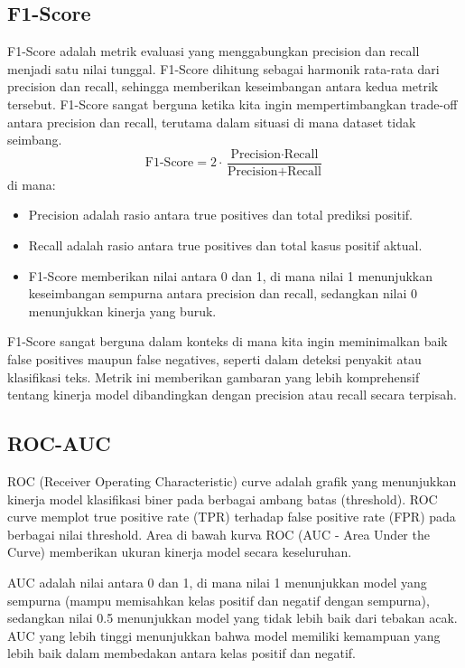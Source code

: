 \subsection{F1-Score}
F1-Score adalah metrik evaluasi yang menggabungkan precision dan recall menjadi satu nilai tunggal. F1-Score dihitung sebagai harmonik rata-rata dari precision dan recall, sehingga memberikan keseimbangan antara kedua metrik tersebut. F1-Score sangat berguna ketika kita ingin mempertimbangkan trade-off antara precision dan recall, terutama dalam situasi di mana dataset tidak seimbang.
\begin{equation}
    \text{F1-Score} = 2 \cdot \frac{\text{Precision} \cdot \text{Recall}}{\text{Precision} + \text{Recall}}
\end{equation}
di mana:
\begin{itemize}
    \item Precision adalah rasio antara true positives dan total prediksi positif.
    \item Recall adalah rasio antara true positives dan total kasus positif aktual.
    \item F1-Score memberikan nilai antara 0 dan 1, di mana nilai 1 menunjukkan keseimbangan sempurna antara precision dan recall, sedangkan nilai 0 menunjukkan kinerja yang buruk.
\end{itemize}
F1-Score sangat berguna dalam konteks di mana kita ingin meminimalkan baik false positives maupun false negatives, seperti dalam deteksi penyakit atau klasifikasi teks. Metrik ini memberikan gambaran yang lebih komprehensif tentang kinerja model dibandingkan dengan precision atau recall secara terpisah.

\subsection{ROC-AUC}
ROC (Receiver Operating Characteristic) curve adalah grafik yang menunjukkan kinerja model klasifikasi biner pada berbagai ambang batas (threshold). ROC curve memplot true positive rate (TPR) terhadap false positive rate (FPR) pada berbagai nilai threshold. Area di bawah kurva ROC (AUC - Area Under the Curve) memberikan ukuran kinerja model secara keseluruhan.

AUC adalah nilai antara 0 dan 1, di mana nilai 1 menunjukkan model yang sempurna (mampu memisahkan kelas positif dan negatif dengan sempurna), sedangkan nilai 0.5 menunjukkan model yang tidak lebih baik dari tebakan acak. AUC yang lebih tinggi menunjukkan bahwa model memiliki kemampuan yang lebih baik dalam membedakan antara kelas positif dan negatif.

